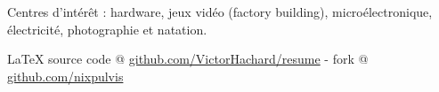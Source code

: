 \documentclass[10pt,letterpaper]{article}
\newcommand{\latex}{\LaTeX\xspace}
\newenvironment{indentsection}[1]
{\begin{list}{}
  {\setlength{\leftmargin}{#1}} \item[]
}
{\end{list}}
\begin{document}
\begin{indentsection}{\parindent}
\begin{description*}
\item[Centres d'intérêt :]
  hardware, jeux vidéo (factory building), microélectronique,
  électricité, photographie et natation.
\end{description*}
\end{indentsection}


\begin{center}
\footnotesize \latex source code @
\href{http://www.github.com/VictorHachard/resume}
{github.com/VictorHachard/resume} - fork @
\href{http://www.github.com/nixpulvis}
{github.com/nixpulvis} \\
\end{center}
\end{document}
